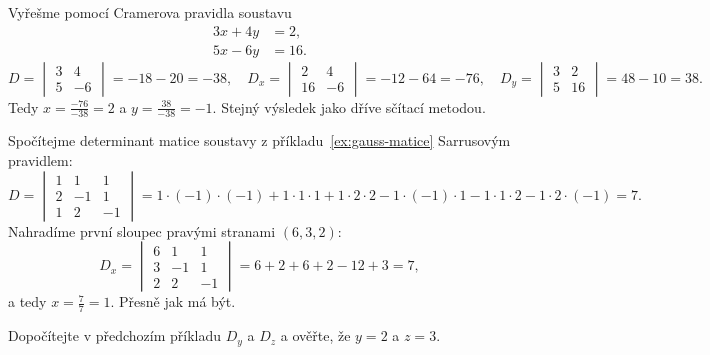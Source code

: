 \begin{example}
  Vyřešme pomocí Cramerova pravidla soustavu
  \begin{align*}
    3x + 4y &= 2,\\
    5x - 6y &= 16.
  \end{align*}
  \begin{equation*}
    D = \begin{vmatrix} 3 & 4\\ 5 & -6 \end{vmatrix} = -18 - 20 = -38,\quad
    D_x = \begin{vmatrix} 2 & 4\\ 16 & -6 \end{vmatrix} = -12 - 64 = -76,\quad
    D_y = \begin{vmatrix} 3 & 2\\ 5 & 16 \end{vmatrix} = 48 - 10 = 38.
  \end{equation*}
  Tedy $x = \frac{-76}{-38} = 2$ a $y = \frac{38}{-38} = -1$. Stejný výsledek jako dříve sčítací metodou.
\end{example}

\begin{example}
  Spočítejme determinant matice soustavy z příkladu~\ref{ex:gauss-matice} Sarrusovým pravidlem:
  \begin{equation*}
    D = \begin{vmatrix} 1 & 1 & 1\\ 2 & -1 & 1\\ 1 & 2 & -1 \end{vmatrix}
    = 1\cdot(-1)\cdot(-1) + 1\cdot 1\cdot 1 + 1\cdot 2\cdot 2 - 1\cdot(-1)\cdot 1 - 1\cdot 1\cdot 2 - 1\cdot 2\cdot(-1) = 7.
  \end{equation*}
  Nahradíme první sloupec pravými stranami $(6, 3, 2)$:
  \begin{equation*}
    D_x = \begin{vmatrix} 6 & 1 & 1\\ 3 & -1 & 1\\ 2 & 2 & -1 \end{vmatrix} = 6 + 2 + 6 + 2 - 12 + 3 = 7,
  \end{equation*}
  a tedy $x = \frac{7}{7} = 1$. Přesně jak má být.
\end{example}

\begin{problem}
  Dopočítejte v předchozím příkladu $D_y$ a $D_z$ a ověřte, že $y = 2$ a $z = 3$.
\end{problem}

